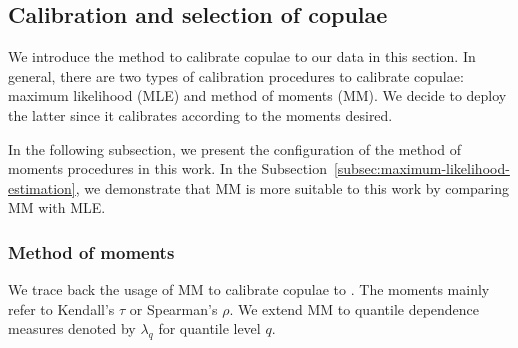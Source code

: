 
\subsection{Calibration and selection of copulae}\label{sec:estimation}
We introduce the method to calibrate copulae to our data in this section.
In general, there are two types of calibration procedures to calibrate copulae:
maximum likelihood (MLE) and method of moments (MM).
We decide to deploy the latter since it calibrates according to the
moments desired. 

In the following subsection, we present the configuration of the method of moments procedures in this work.
In the Subsection~\ref{subsec:maximum-likelihood-estimation}, we demonstrate
that MM is more suitable to this work by comparing MM with MLE. 

\subsubsection{Method of moments}
\label{subsec:simulated-method-of-moments}

We trace back the usage of MM to calibrate copulae to \citet{Genest1987, genest1993statistical}.
The moments mainly refer to Kendall's $\tau$ or Spearman's $\rho$.
We extend MM to quantile dependence measures denoted by $\lambda_q$
for quantile level $q$. 

